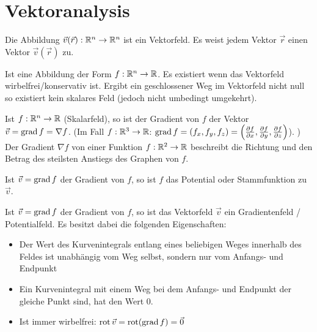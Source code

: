\section{Vektoranalysis}
\begin{definition}[Vektorfeld]
Die Abbildung $\vec{v}(\vec{r}): \mathbb{R}^n \to \mathbb{R}^n$ ist ein Vektorfeld. Es weist jedem
Vektor $\vec{r}$ einen Vektor $\vec{v}(\vec{r})$ zu.
\end{definition}

\begin{definition}[Skalarfeld]
Ist eine Abbildung der Form $f: \mathbb{R}^n \to \mathbb{R}$. Es existiert wenn das Vektorfeld wirbelfrei/konservativ ist. Ergibt ein geschlossener Weg im Vektorfeld nicht null so existiert kein skalares Feld (jedoch nicht umbedingt umgekehrt).
\end{definition}

\begin{definition}[Gradient]
Ist $f: \mathbb{R}^n \to \mathbb{R}$ (Skalarfeld), so ist der Gradient von $f$ der Vektor
$\vec{v} = \operatorname{grad} f = \nabla f$. (Im Fall $f: \mathbb{R}^3 \to \mathbb{R}$:   $\operatorname{grad} f = (f_x, f_y, f_z) =
\left( \frac{\partial f}{\partial x}, \frac{\partial f}{\partial y}, \frac{\partial f}{\partial z} \right)$). ) 
Der Gradient $\nabla f$ von einer Funktion $f : \mathbb{R}^2 \to \mathbb{R}$ beschreibt die Richtung 
und den Betrag des steilsten Anstiegs des Graphen von $f$.
\end{definition}

\begin{definition}[Potential]
Ist $\vec{v} = \operatorname{grad} f$ der Gradient von $f$, so ist $f$ das Potential oder Stammfunktion zu $\vec{v}$.
\end{definition}

\begin{definition}
Ist $\vec{v} = \operatorname{grad} f$ der Gradient von $f$, so ist das Vektorfeld $\vec{v}$
ein Gradientenfeld / Potentialfeld. Es besitzt dabei die folgenden
Eigenschaften:
\begin{itemize}
	\item Der Wert des Kurvenintegrals entlang eines beliebigen Weges innerhalb des
	Feldes ist unabhängig vom Weg selbst, sondern nur vom Anfangs- und Endpunkt
	\item Ein Kurvenintegral mit einem Weg bei dem Anfangs- und Endpunkt der
	gleiche Punkt sind, hat den Wert 0.
	\item Ist immer wirbelfrei: $\operatorname{rot} \vec{v} = \operatorname{rot}(\operatorname{grad} f) = \vec{0}$
\end{itemize}
\end{definition}

